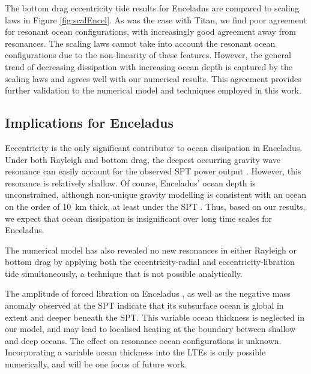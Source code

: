 The bottom drag eccentricity tide results for Enceladus are compared to \citet{chen2013tidal} scaling laws in Figure \ref{fig:scalEncel}. As was the case with Titan, we find poor agreement for resonant ocean configurations, with increasingly good agreement away from resonances. The scaling laws cannot take into account the resonant ocean configurations due to the non-linearity of these features. However, the general trend of decreasing dissipation with increasing ocean depth is captured by the scaling laws and agrees well with our numerical results. This agreement provides further validation to the numerical model and techniques employed in this work.

\subsection{Implications for Enceladus}

Eccentricity is the only significant contributor to ocean dissipation in Enceladus. Under both Rayleigh and bottom drag, the deepest occurring gravity wave resonance can easily account for the observed SPT power output \citep{spencer2006cassini,howett2011high,spencer2013new}. However, this resonance is relatively shallow. Of course, Enceladus' ocean depth is unconstrained, although non-unique gravity modelling is consistent with an ocean on the order of \SI{10}{\kilo\metre} thick, at least under the SPT \citep{iess2014gravity}. Thus, based on our results, we expect that ocean dissipation is insignificant over long time scales for Enceladus. 

The numerical model has also revealed no new resonances in either Rayleigh or bottom drag by applying both the eccentricity-radial and eccentricity-libration tide simultaneously, a technique that is not possible analytically.

The amplitude of forced libration on Enceladus \citep{thomas2015enceladus}, as well as the negative mass anomaly observed at the SPT \citep{iess2014gravity, mckinnon2015effect} indicate that its subsurface ocean is global in extent and deeper beneath the SPT. This variable ocean thickness is neglected in our model, and may lead to localised heating at the boundary between shallow and deep oceans. The effect on resonance ocean configurations is unknown. Incorporating a variable ocean thickness into the LTEs is only possible numerically, and will be one focus of future work.


